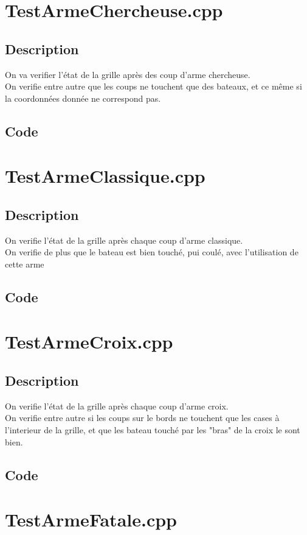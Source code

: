     \section{TestArmeChercheuse.cpp}
        \subsection{Description}
            On va verifier l'état de la grille après des coup d'arme chercheuse.\\
            On verifie entre autre que les coups ne touchent que des bateaux, et ce même si la coordonnées donnée ne correspond pas.
        \subsection{Code}
    \section{TestArmeClassique.cpp}
        \subsection{Description}
            On verifie l'état de la grille après chaque coup d'arme classique.\\
            On verifie de plus que le bateau est bien touché, pui coulé, avec l'utilisation de cette arme
        \subsection{Code}
    \section{TestArmeCroix.cpp}
        \subsection{Description}
            On verifie l'état de la grille après chaque coup d'arme croix.\\
            On verifie entre autre si les coups sur le bords ne touchent que les cases à l'interieur de la grille, et que les bateau touché par les "bras" de la croix le sont bien.
        \subsection{Code}
    \section{TestArmeFatale.cpp}
